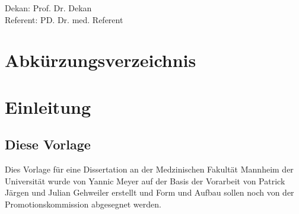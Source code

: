 \documentclass{scrreprt}
\begin{document}
	\thispagestyle{empty}
	\vspace*{\fill}
	\begin{center}
	Dekan: Prof. Dr. Dekan\\
	Referent: PD. Dr. med. Referent
         \end{center}

\tableofcontents
\thispagestyle{empty}

\cleardoubleoddpage%
\pagestyle{scrheadings}


\chapter*{Abkürzungsverzeichnis} 
 \label{sec:abk_Verz}
\begin{acronym}[ABCDE] %
\end{acronym}

\chapter{Einleitung}
\section{Diese Vorlage}
Dies Vorlage für eine Dissertation an der Medzinischen Fakultät Mannheim der Universität wurde von Yannic Meyer auf der Basis der Vorarbeit von Patrick Järgen und Julian Gehweiler erstellt und Form und Aufbau sollen noch von der Promotionskommission abgesegnet werden. 
\end{document}
